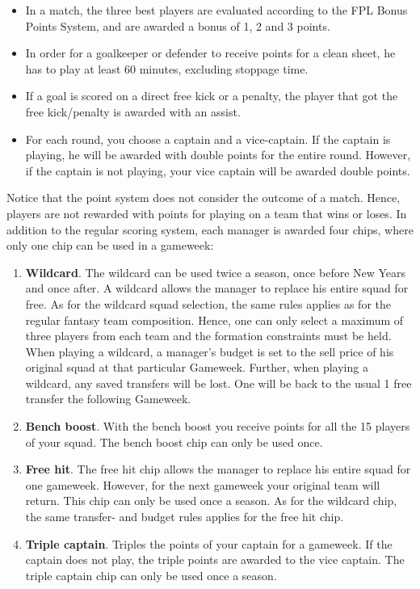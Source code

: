 \begin{itemize}
    \item In a match, the three best players are evaluated according to the FPL Bonus Points System, and are awarded a bonus of 1, 2 and 3 points. 
    \item In order for a goalkeeper or defender to receive points for a clean sheet, he has to play at least 60 minutes, excluding stoppage time. 
    \item If a goal is scored on a direct free kick or a penalty, the player that got the free kick/penalty is awarded with an assist. 
    \item For each round, you choose a captain and a vice-captain. If the captain is playing, he will be awarded with double points for the entire round. However, if the captain is not playing, your vice captain will be awarded double points. 
\end{itemize}
Notice that the point system does not consider the outcome of a match. Hence, players are not rewarded with points for playing on a team that wins or loses. 
\newpar
In addition to the regular scoring system, each manager is awarded four chips, where only one chip can be used in a gameweek: 
\begin{enumerate} [label=(\roman*)]

\item \textbf{Wildcard}. The wildcard can be used twice a season, once before New Years and once after. A wildcard allows the manager to replace his entire squad for free. As for the wildcard squad selection, the same rules applies as for the regular fantasy team composition. Hence, one can only select a maximum of three players from each team and the formation constraints must be held. When playing a wildcard, a manager's budget is set to the sell price of his original squad at that particular Gameweek. Further, when playing a wildcard, any saved transfers will be lost. One will be back to the usual 1 free transfer the following Gameweek.

\item \textbf{Bench boost}. With the bench boost you receive points for all the 15 players of your squad. The bench boost chip can only be used once. 

\item \textbf{Free hit}. The free hit chip allows the manager to replace his entire squad for one gameweek. However, for the next gameweek your original team will return.  This chip can only be used once a season. As for the wildcard chip, the same transfer- and budget rules applies for the free hit chip.

\item \textbf{Triple captain}. Triples the points of your captain for a gameweek. If the captain does not play, the triple points are awarded to the vice captain. The triple captain chip can only be used once a season. 
\end{enumerate}

